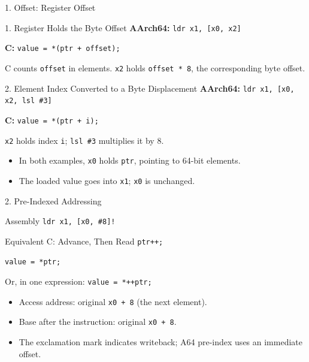 \documentclass[aspectratio=169,11pt,t]{beamer}
\newcommand{\code}[1]{\texttt{#1}}
\begin{document}
\begin{frame}{1. Offset: Register Offset}
\begin{block}{1. Register Holds the Byte Offset}
\textbf{AArch64:} \code{ldr x1, [x0, x2]}\par
\textbf{C:} \code{value = *(ptr + offset);}\par
C counts \code{offset} in elements. \code{x2} holds \code{offset * 8}, the corresponding byte offset.
\end{block}
\vspace{0.1cm}
\begin{block}{2. Element Index Converted to a Byte Displacement}
\textbf{AArch64:} \code{ldr x1, [x0, x2, lsl \#3]}\par
\textbf{C:} \code{value = *(ptr + i);}\par
\code{x2} holds index \code{i}; \code{lsl \#3} multiplies it by 8.
\end{block}
\vspace{0.1cm}
\begin{itemize}
\item In both examples, \code{x0} holds \code{ptr}, pointing to 64-bit elements.
\item The loaded value goes into \code{x1}; \code{x0} is unchanged.
\end{itemize}
\end{frame}






\begin{frame}{2. Pre-Indexed Addressing}
\begin{block}{Assembly}
\code{ldr x1, [x0, \#8]!}
\end{block}
\begin{block}{Equivalent C: Advance, Then Read}
\code{ptr++;}\par
\code{value = *ptr;}\par
Or, in one expression: \code{value = *++ptr;}
\end{block}
\begin{itemize}
\item Access address: original \code{x0 + 8} (the next element).
\item Base after the instruction: original \code{x0 + 8}.
\item The exclamation mark indicates writeback; A64 pre-index uses an immediate offset.
\end{itemize}
\end{frame}
\end{document}
